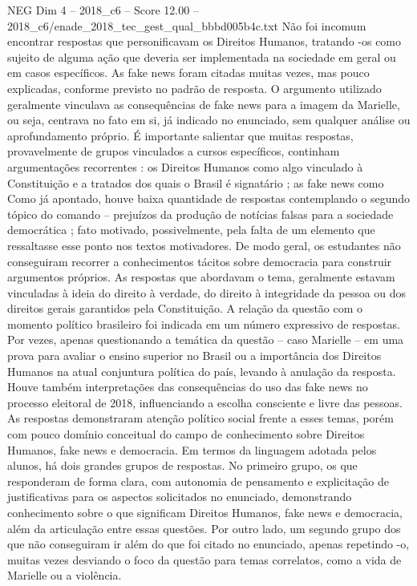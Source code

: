 \begin{textsample}{NEG Dim 4 – 2018\_c6 – Score 12.00 – 2018\_c6/enade\_2018\_tec\_gest\_qual\_bbbd005b4c.txt}
Não foi incomum encontrar respostas que personificavam os Direitos Humanos, tratando -os como sujeito de alguma ação que deveria ser implementada na sociedade em geral ou em casos específicos.
As fake news foram citadas muitas vezes, mas pouco explicadas, conforme previsto no padrão de resposta.
O argumento utilizado geralmente vinculava as consequências de fake news para a imagem da Marielle, ou seja, centrava no fato em si, já indicado no enunciado, sem qualquer análise ou aprofundamento próprio.
É importante salientar que muitas respostas, provavelmente de grupos vinculados a cursos específicos, continham argumentações recorrentes : os Direitos Humanos como algo vinculado à Constituição e a tratados dos quais o Brasil é signatário ; as fake news como Como já apontado, houve baixa quantidade de respostas contemplando o segundo tópico do comando – prejuízos da produção de notícias falsas para a sociedade democrática ; fato motivado, possivelmente, pela falta de um elemento que ressaltasse esse ponto nos textos motivadores.
De modo geral, os estudantes não conseguiram recorrer a conhecimentos tácitos sobre democracia para construir argumentos próprios.
As respostas que abordavam o tema, geralmente estavam vinculadas à ideia do direito à verdade, do direito à integridade da pessoa ou dos direitos gerais garantidos pela Constituição.
A relação da questão com o momento político brasileiro foi indicada em um número expressivo de respostas.
Por vezes, apenas questionando a temática da questão – caso Marielle – em uma prova para avaliar o ensino superior no Brasil ou a importância dos Direitos Humanos na atual conjuntura política do país, levando à anulação da resposta.
Houve também interpretações das consequências do uso das fake news no processo eleitoral de 2018, influenciando a escolha consciente e livre das pessoas.
As respostas demonstraram atenção político social frente a esses temas, porém com pouco domínio conceitual do campo de conhecimento sobre Direitos Humanos, fake news e democracia.
Em termos da linguagem adotada pelos alunos, há dois grandes grupos de respostas.
No primeiro grupo, os que responderam de forma clara, com autonomia de pensamento e explicitação de justificativas para os aspectos solicitados no enunciado, demonstrando conhecimento sobre o que significam Direitos Humanos, fake news e democracia, além da articulação entre essas questões.
Por outro lado, um segundo grupo dos que não conseguiram ir além do que foi citado no enunciado, apenas repetindo -o, muitas vezes desviando o foco da questão para temas correlatos, como a vida de Marielle ou a violência.

\end{textsample}
